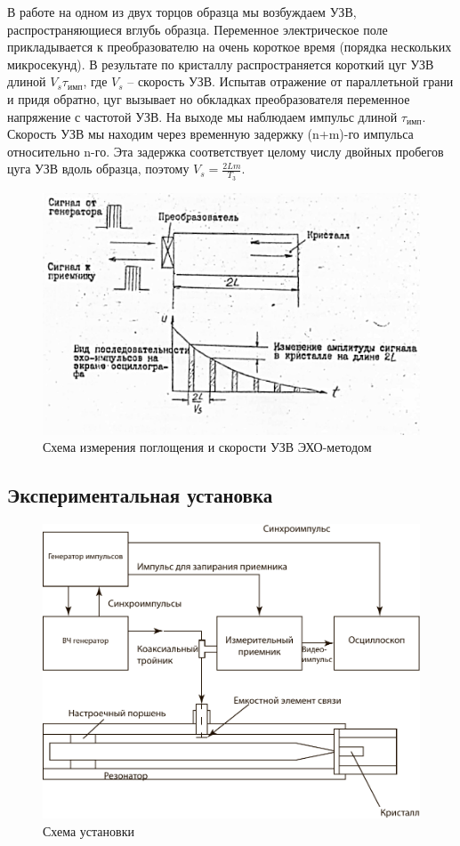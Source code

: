 \documentclass[a4paper, 12pt]{article}
\begin{document}
В работе на одном из двух торцов образца мы возбуждаем УЗВ, распространяющиеся вглубь образца. Переменное электрическое поле прикладывается к преобразователю на очень короткое время (порядка нескольких микросекунд). В результате по кристаллу распространяется короткий цуг УЗВ длиной $V_{s}\tau_{\text{имп}}$, где $V_{s}$ – скорость УЗВ. Испытав отражение от параллетьной грани и придя обратно, цуг вызывает но обкладках преобразователя переменное напряжение с частотой УЗВ. На выходе мы наблюдаем импульс длиной $\tau_{\text{имп}}$. Скорость УЗВ мы находим через временную задержку (n+m)-го импульса относительно n-го. Эта задержка соответствует целому числу двойных пробегов цуга УЗВ вдоль образца, поэтому $V_{s}=\frac{2Lm}{T_{3}}$.
\newpage
\begin{figure}[h!]
    \centering
		\includegraphics[scale=0.7]{img/Снимок экрана 2025-02-25 191233.png}
    \caption{Схема измерения поглощения и скорости УЗВ ЭХО-методом}
\end{figure}

\subsection{Экспериментальная установка}
    \begin{figure}[h!]
    \centering
		\includegraphics[scale=0.7]{pdf/scheme.pdf}
    \caption{Схема установки}
\end{figure}
\end{document}
